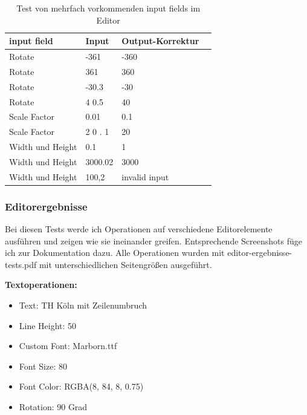 \begin{table}[!htbp]
	\centering
	\begin{tabular}{|p{4cm}|p{3cm}|p{3cm}|p{3cm}|}
		\hline
		\textbf{input field}	& \textbf{Input} 	& \textbf{Output-Korrektur}		\\ 
		\hline
		Rotate					& -361 						& -360  				\\
		Rotate					& 361 						& 360 					\\ 
		Rotate					& -30.3 					& -30  					\\
		Rotate					& 4 0.5 					& 40 					\\ 
		Scale Factor			& 0.01						& 0.1 					\\
		Scale Factor			& 2 0 . 1					& 20 					\\
		Width und Height		& 0.1						& 1 					\\
		Width und Height		& 3000.02					& 3000 					\\
		Width und Height		& 100,2						& invalid input 		\\
		\hline
	\end{tabular}
	\caption{Test von mehrfach vorkommenden input fields im Editor}
	\label{table:editor-input}
\end{table}

\subsubsection{Editorergebnisse}
Bei diesen Tests werde ich Operationen auf verschiedene Editorelemente ausführen und zeigen wie sie ineinander greifen. Entsprechende Screenshots füge ich zur Dokumentation dazu. Alle Operationen wurden mit editor-ergebnisse-tests.pdf mit unterschiedlichen Seitengrößen ausgeführt. 

\textbf{Textoperationen:}
\begin{itemize}
	\item Text: TH Köln mit Zeilenumbruch
	\item Line Height: 50
	\item Custom Font: Marborn.ttf
	\item Font Size: 80
	\item Font Color: RGBA(8, 84, 8, 0.75)
	\item Rotation: 90 Grad
\end{itemize}


